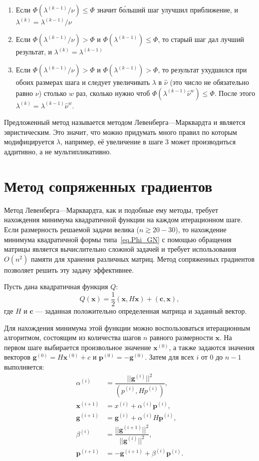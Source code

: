 \documentclass[fontsize=12pt, paper=a4]{article}
\renewcommand{\vec}[1]{\mathbf{#1}}
\def\x{\vec{x}}
\def\c{\vec{c}}
\begin{document}
\begin{enumerate}
 \item Если $\Phi(\lambda^{(k-1)} / \nu) \leq \Phi$ значит б\'{о}льший шаг улучшил приближение, и $\lambda^{(k)} = \lambda^{(k-1)} / \nu$
 \item Если $\Phi(\lambda^{(k-1)} / \nu) > \Phi$ и $\Phi(\lambda^{(k-1)}) \leq \Phi$, то старый шаг дал лучший результат, и $\lambda^{(k)} = \lambda^{(k-1)}$
 \item Если $\Phi(\lambda^{(k-1)} / \nu) > \Phi$ и $\Phi(\lambda^{(k-1)}) > \Phi$, то результат ухудшился при обоих размерах шага и следует увеличивать $\lambda$ в $\hat\nu$ (это число не обязательно равно $\nu$) столько $w$ раз, сколько нужно чтоб $\Phi(\lambda^{(k-1)} \hat\nu^w) \leq \Phi$.
  После этого $\lambda^{(k)} = \lambda^{(k-1)} \hat\nu^w$.
\end{enumerate}

Предложенный метод называется методом Левенберга---Марквардта и является эвристическим.
Это значит, что можно придумать много правил по которым модифицируется $\lambda$, например, её увеличение в шаге 3 может производиться аддитивно, а не мультипликативно.

\section{Метод сопряженных градиентов}
Метод Левенберга---Марквардта, как и подобные ему методы, требует нахождения минимума квадратичной функции на каждом итерационном шаге.
Если размерность решаемой задачи велика ($n \gtrsim 20-30$), то нахождение минимума квадратичной формы типа~\eqref{eq.Phi_GN} с помощью обращения матрицы является вычислительно сложной задачей и требует использования $O(n^2)$ памяти для хранения различных матриц.
Метод сопряженных градиентов позволяет решить эту задачу эффективнее.

Пусть дана квадратичная функция $Q$:
\begin{equation}
Q(\x) = \dfrac12 (\x, H \x) + (\c, \x),
\end{equation}
где $H$ и $\c$ --- заданная положительно определенная матрица и заданный вектор.

Для нахождения минимума этой функции можно воспользоваться итерационным алгоритмом, состоящим из количества шагов $n$ равного размерности $\x$.
На первом шаге выбирается произвольное значение $\x^{(0)}$, а также задаются значения векторов $\vec{g}^{(0)} = H\x^{(0)} + c$ и $\vec{p}^{(0)} = - \vec{g}^{(0)}$.
Затем для всех $i$ от 0 до $n-1$ выполняется:
\begin{equation}
\begin{split}
 \alpha^{(i)} &= \dfrac{||\vec{g}^{(i)}||^2}{(p^{(i)}, H p^{(i)})},\\
 \x^{(i+1)} &= x^{(i)} + \alpha^{(i)} \vec{p}^{(i)},\\
 \vec{g}^{(i+1)} &= \vec{g}^{(i)} + \alpha^{(i)} H \vec{p}^{(i)},\\
 \beta^{(i)} &= \dfrac{||\vec{g}^{(i+1)}||^2}{||\vec{g}^{(i)}||^2},\\
 \vec{p}^{(i+1)} &= -\vec{g}^{(i+1)} + \beta^{(i)} \vec{p}^{(i)}.
\end{split}
\end{equation}
\end{document}
